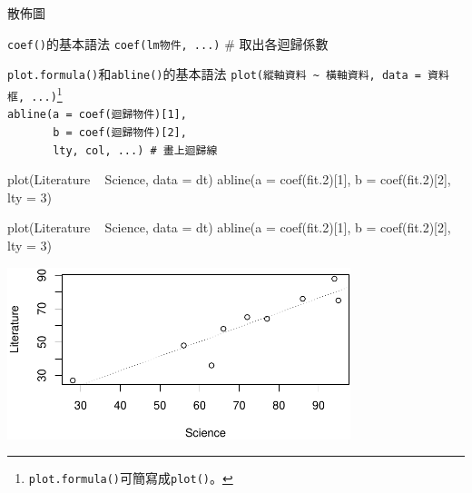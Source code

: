 \documentclass[14pt, aspectratio=43]{beamer}
\let\oldfootnote\footnote
\renewcommand\footnote[1]{\hspace{-0.7em}\oldfootnote{\ignorespaces#1}\hspace{0.5em}}
\begin{document}
\begin{frame}[fragile]{散佈圖}

\begin{block}{\texttt{coef()}的基本語法}
\verb+coef(lm物件, ...)+  \# 取出各迴歸係數
\end{block}

\begin{block}{\texttt{plot.formula()}和\texttt{abline()}的基本語法}
\verb+plot(縱軸資料 ~ 橫軸資料, data = 資料框, ...)+\oldfootnote{\texttt{plot.formula()}可簡寫成\texttt{plot()}。}\\
\verb+abline(a = coef(迴歸物件)[1],+\\
\verb+       b = coef(迴歸物件)[2],+\\
\verb+       lty, col, ...) # 畫上迴歸線 +
\end{block}

\begin{RC}
plot(Literature ~ Science, data = dt)
abline(a = coef(fit.2)[1], b = coef(fit.2)[2],
       lty = 3)
\end{RC}

\framebreak

\begin{RC}
plot(Literature ~ Science, data = dt)
abline(a = coef(fit.2)[1], b = coef(fit.2)[2],
       lty = 3)
\end{RC}

\begin{center}
\includegraphics[width=0.75\textwidth]{Rplot-sct.pdf}
\end{center}
\end{frame}

%




\end{document}
